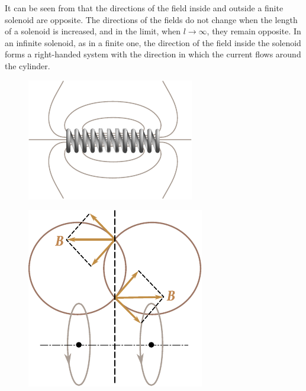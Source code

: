 It can be seen from  that the directions of the field inside and outside a finite solenoid are opposite. The directions of the fields do not change when the length of a solenoid is increased, and in the limit, when $l\to\infty$, they remain opposite. In an infinite solenoid, as in a finite one, the direction of the field inside the solenoid forms a right-handed system with the direction in which the current flows around the cylinder.

\begin{figure}[t]
	\begin{minipage}[t]{0.48\linewidth}
		\begin{center}
			\includegraphics[scale=1]{figures/ch_06/fig_6_27b.pdf}
			\caption[]{}
			\label{fig:6_27}
		\end{center}
	\end{minipage}
	\hfill{ }%
	\begin{minipage}[t]{0.48\linewidth}
		\begin{center}
			\includegraphics[scale=1]{figures/ch_06/fig_6_28.pdf}
			\caption[]{}
			\label{fig:6_28}
		\end{center}
	\end{minipage}
\vspace{-0.4cm}
\end{figure}

